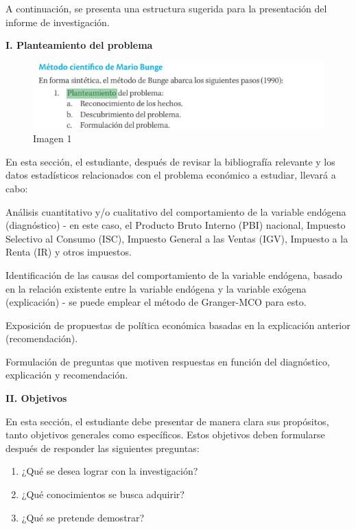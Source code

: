 \documentclass[
  a4paper,
]{article}
\providecommand{\tightlist}{%
  \setlength{\itemsep}{0pt}\setlength{\parskip}{0pt}}\usepackage{longtable,booktabs,array}
\begin{document}
A continuación, se presenta una estructura sugerida para la presentación
del informe de investigación.

\textbf{I. Planteamiento del problema}

\begin{figure}

\caption{\label{fig-1}Imagen 1}

{\centering \includegraphics{20230603152205.png}

}

\end{figure}

En esta sección, el estudiante, después de revisar la bibliografía
relevante y los datos estadísticos relacionados con el problema
económico a estudiar, llevará a cabo:

Análisis cuantitativo y/o cualitativo del comportamiento de la variable
endógena (diagnóstico) - en este caso, el Producto Bruto Interno (PBI)
nacional, Impuesto Selectivo al Consumo (ISC), Impuesto General a las
Ventas (IGV), Impuesto a la Renta (IR) y otros impuestos.

Identificación de las causas del comportamiento de la variable endógena,
basado en la relación existente entre la variable endógena y la variable
exógena (explicación) - se puede emplear el método de Granger-MCO para
esto.

Exposición de propuestas de política económica basadas en la explicación
anterior (recomendación).

Formulación de preguntas que motiven respuestas en función del
diagnóstico, explicación y recomendación.

\textbf{II. Objetivos}

En esta sección, el estudiante debe presentar de manera clara sus
propósitos, tanto objetivos generales como específicos. Estos objetivos
deben formularse después de responder las siguientes preguntas:

\begin{enumerate}
\def\labelenumi{\arabic{enumi}.}
\tightlist
\item
  ¿Qué se desea lograr con la investigación?
\item
  ¿Qué conocimientos se busca adquirir?
\item
  ¿Qué se pretende demostrar?
\end{enumerate}
\end{document}
